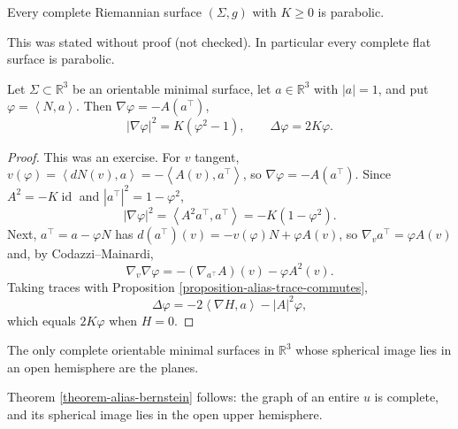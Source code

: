 \begin{theorem}
\label{theorem-alias-ahlfors-huber}
Every complete Riemannian surface
$(\Sigma,g)$ with $K\geq 0$ is parabolic.
\end{theorem}

This was stated without proof (not
checked). In particular every complete
flat surface is parabolic.

\begin{proposition}
\label{proposition-alias-minimal-normal}
Let $\Sigma\subset\mathbb{R}^3$ be an
orientable minimal surface, let
$a\in\mathbb{R}^3$ with $|a|=1$, and put
$\varphi=\left\langle{} N,a
\right\rangle{}$. Then
$\nabla\varphi=-A(a^{\top})$,
$$
|\nabla\varphi|^2=K(\varphi^2-1),
\qquad
\Delta\varphi=2K\varphi.
$$
\end{proposition}

\begin{proof}
This was an exercise. For $v$ tangent,
$v(\varphi)=\left\langle{} dN(v),a
\right\rangle{}=-\left\langle{} A(v),
a^{\top}\right\rangle{}$, so
$\nabla\varphi=-A(a^{\top})$. Since
$A^2=-K\operatorname{id}$ and
$|a^{\top}|^2=1-\varphi^2$,
$$
|\nabla\varphi|^2=\left\langle{}
A^2a^{\top},a^{\top}\right\rangle{}
=-K(1-\varphi^2).
$$
Next,
$a^{\top}=a-\varphi N$ has
$d(a^{\top})(v)=-v(\varphi)N+\varphi A(v)$,
so $\nabla_va^{\top}=\varphi A(v)$ and,
by Codazzi--Mainardi,
$$
\nabla_v\nabla\varphi
=-(\nabla_{a^{\top}}A)(v)
-\varphi A^2(v).
$$
Taking traces with Proposition
\ref{proposition-alias-trace-commutes},
$$
\Delta\varphi
=-2\left\langle{} \nabla H,a
\right\rangle{}-|A|^2\varphi,
$$
which equals $2K\varphi$ when $H=0$.
\end{proof}

\begin{theorem}
\label{theorem-alias-chern}
The only complete orientable minimal
surfaces in $\mathbb{R}^3$ whose spherical
image lies in an open hemisphere are the
planes.
\end{theorem}

Theorem \ref{theorem-alias-bernstein}
follows: the graph of an entire $u$ is
complete, and its spherical image lies in
the open upper hemisphere.


